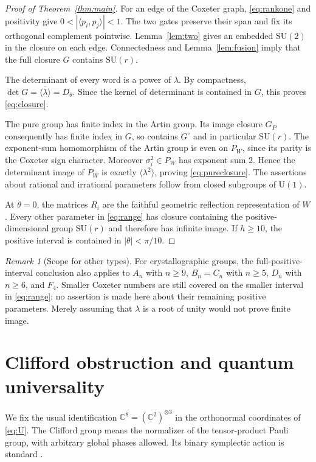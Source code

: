 \documentclass[11pt,a4paper]{article}
\theoremstyle{remark}\newtheorem{remark}[theorem]{Remark}
\newcommand{\U}{\mathrm U}
\newcommand{\SU}{\mathrm {SU}}
\newcommand{\C}{\mathbb C}
\begin{document}
\begin{proof}[Proof of Theorem~\ref{thm:main}]
For an edge of the Coxeter graph, \eqref{eq:rankone} and positivity give
$0<|\langle p_i,p_j\rangle|<1$.  The two gates preserve their span and
fix its orthogonal complement pointwise.  Lemma~\ref{lem:two} gives an
embedded $\SU(2)$ in the closure on each edge.  Connectedness and
Lemma~\ref{lem:fusion} imply that the full closure $G$ contains $\SU(r)$.

The determinant of every word is a power of $\lambda$.  By compactness,
$\det G=\overline{\langle\lambda\rangle}=D_\theta$.  Since the kernel
of determinant is contained in $G$, this proves \eqref{eq:closure}.

The pure group has finite index in the Artin group.  Its image closure
$G_P$ consequently has finite index in $G$, so contains $G^\circ$ and
in particular $\SU(r)$.  The exponent-sum homomorphism of the Artin group
is even on $P_W$, since its parity is the Coxeter sign character.  Moreover
$\sigma_i^2\in P_W$ has exponent sum $2$.  Hence the determinant image
of $P_W$ is exactly $\langle\lambda^2\rangle$, proving
\eqref{eq:pureclosure}.  The assertions about rational and irrational
parameters follow from closed subgroups of $\U(1)$.

At $\theta=0$, the matrices $R_i$ are the faithful geometric reflection
representation of $W$.  Every other parameter in \eqref{eq:range}
has closure containing the positive-dimensional group $\SU(r)$ and
therefore has infinite image.  If $h\geq10$, the positive interval is
contained in $|\theta|<\pi/10$.
\end{proof}

\begin{remark}[Scope for other types]
For crystallographic groups, the full-positive-interval conclusion also
applies to $A_n$ with $n\geq9$, $B_n=C_n$ with $n\geq5$, $D_n$ with
$n\geq6$, and $F_4$.  Smaller Coxeter numbers are still covered on the
smaller interval in \eqref{eq:range}; no assertion is made here about
their remaining positive parameters.  Merely assuming that $\lambda$
is a root of unity would not prove finite image.
\end{remark}

\section{Clifford obstruction and quantum universality}
We fix the usual identification $\C^8=(\C^2)^{\otimes3}$ in the
orthonormal coordinates of \eqref{eq:U}.  The Clifford group means the
normalizer of the tensor-product Pauli group, with arbitrary global
phases allowed.  Its binary symplectic action is standard \cite{DDM}.
\end{document}
